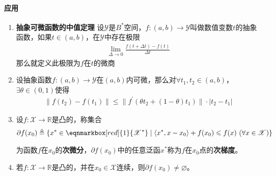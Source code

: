 \paragraph{应用}
\begin{enumerate}[leftmargin=2cm, label=\arabic*]
    \item \textbf{抽象可微函数的中值定理} 设$\mathscr{Y}$是$B^*$空间，$f:(a,b)\to\mathscr{Y}$叫做数值变数$t$的抽象函数，如果$t\in(a,b)$，在$\mathscr{Y}$中存在极限
    \begin{align*}
        \lim\limits_{\Delta\to 0} \frac{f(t+\Delta t) - f(t)}{\Delta t}   
    \end{align*}
    那么就定义此极限为$f$在$t$的微商
    \item 设抽象函数$f:(a,b)\to \mathscr{Y}$在$(a,b)$内可微，那么对$\forall t_1, t_2\in(a,b)$，$\exists \theta\in(0,1)$使得
    \begin{align*}
        \|f(t_2) - f(t_1)\| \leqslant \|f^{\prime}(\theta t_2 + (1-\theta)t_1)\| \cdot |t_2-t_1|
    \end{align*}

    \item 设$f:\mathscr{X}\to\mathbb{R}$是凸的，称集合
    \begin{align*}
        \partial f(x_0) \triangleq \{x^*\in\eqnmarkbox[red]{1}{\mathscr{X}^*}\mid \langle x^*, x-x_0\rangle + f(x_0) \leqslant f(x)\ (\forall x\in\mathscr{X}) \}
    \end{align*}
    
    为函数$f$在$x_0$的\textbf{次微分}，$\partial f(x_0)$中的任意泛函$x^*$称为$f$在$x_0$点的\textbf{次梯度}。

    \item 若$f:\mathscr{X}\to\mathbb{R}$是凸的，并在$x_0\in\mathscr{X}$连续，则$\partial f(x_0)\neq\varnothing$。
    
\end{enumerate}


